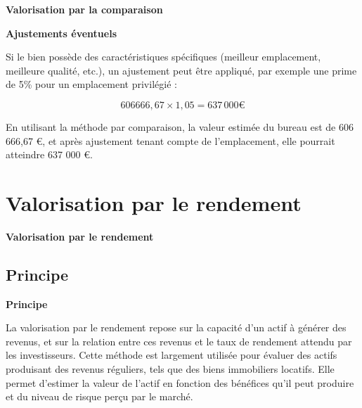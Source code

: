 \documentclass{beamer}
\begin{document}
\begin{frame}{\textbf{Valorisation par la comparaison}}

\begin{exampleblock}{\textbf{Ajustements éventuels}}

Si le bien possède des caractéristiques spécifiques (meilleur emplacement, meilleure qualité, etc.), un ajustement peut être appliqué, par exemple une prime de 5\% pour un emplacement privilégié :

\[ 606 666,67\times1,05=637\,000\text{€} \]

En utilisant la méthode par comparaison, la valeur estimée du bureau est de 606 666,67 €, et après ajustement tenant compte de l’emplacement, elle pourrait atteindre 637 000 €.

\end{exampleblock}	
	


	
\end{frame}



	
	
\section{Valorisation par le rendement}
\begin{frame}{\textbf{Valorisation par le rendement}}

\subsection{Principe}
\begin{block}{\textbf{Principe}}
	
La valorisation par le rendement repose sur la capacité d’un actif à générer des revenus, et sur la relation entre ces revenus et le taux de rendement attendu par les investisseurs. Cette méthode est largement utilisée pour évaluer des actifs produisant des revenus réguliers, tels que des biens immobiliers locatifs. Elle permet d’estimer la valeur de l’actif en fonction des bénéfices qu’il peut produire et du niveau de risque perçu par le marché.
	
\end{block}

\end{frame}
\end{document}
